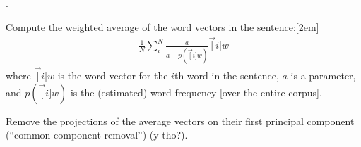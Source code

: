 \documentclass[11pt]{article}
\begin{document}
\myspace
\p {}.
\begin{compactenum}
	\item Compute the weighted average of the word vectors in the sentence:[2em]
	\begin{align}
	\frac{1}{N} \sum_{i}^{N} \frac{a}{a + p(\vec[i]{w})} \vec[i]{w}
	\end{align}
	where $\vec[i]{w}$ is the word vector for the $i$th word in the sentence, $a$ is a parameter, and $p(\vec[i]{w})$ is the (estimated) word frequency [over the entire corpus]. 
	
	\item Remove the projections of the average vectors on their first principal component (``common component removal'') (y tho?).
\end{compactenum}

\end{document}

